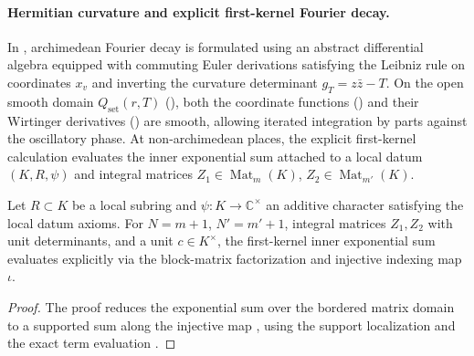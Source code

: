 \paragraph{Hermitian curvature and explicit first-kernel Fourier decay.}
In , archimedean Fourier decay is
formulated using an abstract differential algebra
 equipped with commuting Euler
derivations satisfying the Leibniz rule on coordinates $x_v$ and inverting the
curvature determinant $g_T = z \bar{z} - T$.
On the open smooth domain $Q_{\mathrm{set}}(r, T)$
(), both the coordinate
functions () and their
Wirtinger derivatives () are
smooth, allowing iterated integration by parts against the oscillatory phase.
At non-archimedean places, the explicit first-kernel calculation evaluates the
inner exponential sum attached to a local datum $(K, R, \psi)$ and integral
matrices $Z_1 \in \operatorname{Mat}_m(K)$, $Z_2 \in \operatorname{Mat}_{m'}(K)$.

\begin{proposition}
\label{prop:ch03-first-kernel-sum}
Let $R \subset K$ be a local subring and $\psi : K \to \mathbb{C}^{\times}$ an
additive character satisfying the local datum axioms.
For $N = m + 1$, $N' = m' + 1$, integral matrices $Z_1, Z_2$ with unit
determinants, and a unit $c \in K^{\times}$, the first-kernel inner exponential
sum evaluates explicitly via the block-matrix factorization and injective
indexing map $\iota$.
\end{proposition}

\begin{proof}
The proof reduces the exponential sum over the bordered matrix domain to a
supported sum along the injective map
, using the support
localization  and the
exact term evaluation .
\end{proof}

